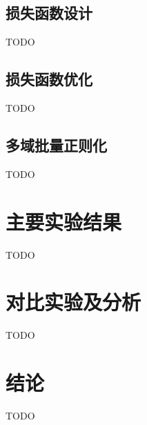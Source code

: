 \subsection{损失函数设计}
TODO
\subsection{损失函数优化}
TODO
\subsection{多域批量正则化}
TODO

\section{主要实验结果}
TODO

\section{对比实验及分析}
TODO

\section{结论}
TODO

